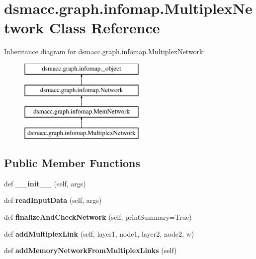 \hypertarget{classdsmacc_1_1graph_1_1infomap_1_1MultiplexNetwork}{}\section{dsmacc.\+graph.\+infomap.\+Multiplex\+Network Class Reference}
\label{classdsmacc_1_1graph_1_1infomap_1_1MultiplexNetwork}
Inheritance diagram for dsmacc.\+graph.\+infomap.\+Multiplex\+Network\+:\begin{figure}[H]
\begin{center}
\leavevmode
\includegraphics[height=4.000000cm]{classdsmacc_1_1graph_1_1infomap_1_1MultiplexNetwork}
\end{center}
\end{figure}
\subsection*{Public Member Functions}
\begin{DoxyCompactItemize}
\item 
\mbox{\label{classdsmacc_1_1graph_1_1infomap_1_1MultiplexNetwork_ab934caf83084458f4cbd9250f4e52499}} 
def {\bfseries \+\_\+\+\_\+init\+\_\+\+\_\+} (self, args)
\item 
\mbox{\label{classdsmacc_1_1graph_1_1infomap_1_1MultiplexNetwork_a95a5b5b615a359f11d4f44d253416a63}} 
def {\bfseries read\+Input\+Data} (self, args)
\item 
\mbox{\label{classdsmacc_1_1graph_1_1infomap_1_1MultiplexNetwork_a9a30f65a77d78bc5007fc85dccb1de3e}} 
def {\bfseries finalize\+And\+Check\+Network} (self, print\+Summary=True)
\item 
\mbox{\label{classdsmacc_1_1graph_1_1infomap_1_1MultiplexNetwork_aa53552a3bbdac043d2cce6bcd4d6ad17}} 
def {\bfseries add\+Multiplex\+Link} (self, layer1, node1, layer2, node2, w)
\item 
\mbox{\label{classdsmacc_1_1graph_1_1infomap_1_1MultiplexNetwork_aad897786c96325edcb1b8d4b087f22ff}} 
def {\bfseries add\+Memory\+Network\+From\+Multiplex\+Links} (self)
\end{DoxyCompactItemize}
